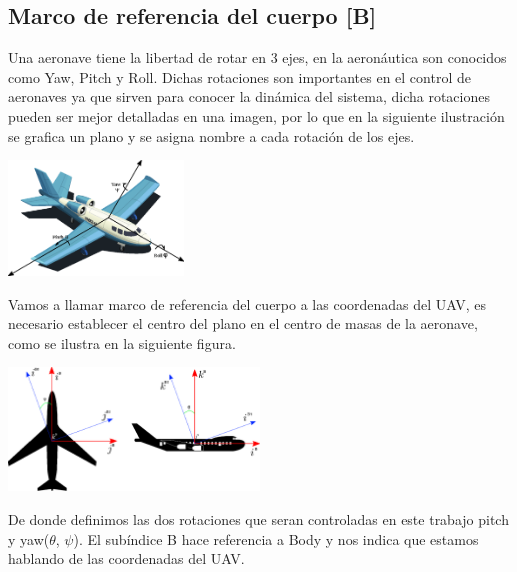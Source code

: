 \subsection{Marco de referencia del cuerpo [B]}
Una aeronave tiene la libertad de rotar en 3 ejes, en la aeronáutica son conocidos como
Yaw, Pitch y Roll. Dichas rotaciones son importantes en el control de aeronaves ya
que sirven para conocer la dinámica del sistema, dicha rotaciones pueden ser mejor
detalladas en una imagen, por lo que en la siguiente ilustración se grafica un plano
y se asigna nombre a cada rotación de los ejes.
\begin{center}
	\includegraphics[width=0.35\textwidth]{Contenido/Cuerpo/Capitulo3/Fig6.eps}
	\label{fig:ModeloMat:Fig1}
\end{center}
Vamos a llamar marco de referencia del cuerpo a las coordenadas del UAV, es necesario establecer el centro del plano en el 
centro de masas de la aeronave, como se ilustra en la siguiente figura.
\begin{center}
	\includegraphics[width=0.5\textwidth]{Contenido/Cuerpo/Capitulo3/Fig5.eps}
	\label{fig:ModeloMat:Fig1}
\end{center}
De donde definimos las dos rotaciones que seran controladas en este trabajo pitch y yaw($\theta$, $\psi$). El subíndice B hace referencia
a Body y nos indica que estamos hablando de las coordenadas del UAV.

